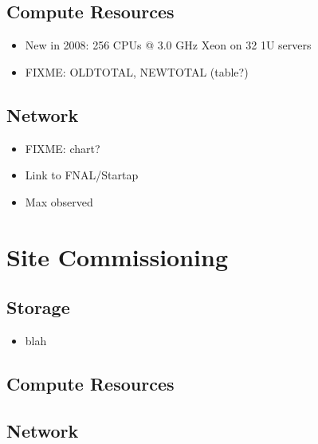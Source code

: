\documentclass{beamer}
\begin{document}
\subsection{Compute Resources}
\begin{frame}
\begin{itemize}
    \item New in 2008: 256 CPUs @ 3.0 GHz Xeon on 32 1U servers
    \item FIXME: OLDTOTAL, NEWTOTAL (table?)
\end{itemize}
\end{frame}

\subsection{Network}
\begin{frame}
\begin{itemize}
    \item FIXME: chart?
    \item Link to FNAL/Startap
    \item Max observed
\end{itemize}
\end{frame}

\section{Site Commissioning}
\subsection{Storage}
\begin{frame}
\begin{itemize}
    \item blah
\end{itemize}
\end{frame}

\subsection{Compute Resources}
\begin{frame}
\end{frame}

\subsection{Network}
\begin{frame}
\end{frame}
\end{document}
